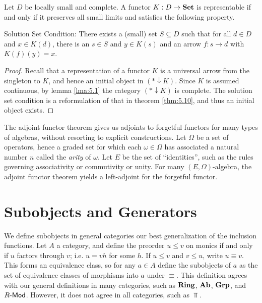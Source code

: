 \begin{theorem}\label{thm:5.12}
	Let $D$ be locally small and complete. A functor $K : D \to \mathbf{Set} $ is representable if and only if it preserves all small limits and satisfies the following property.

	Solution Set Condition: There exists a (small) set $S\subseteq D$ such that for all $d\in D$ and $x\in K(d)$, there is an $s\in S$ and $y\in K(s)$ and an arrow $f : s \to d$ with $K(f)(y)=x$.
\end{theorem}
\begin{proof}
	Recall that a representation of a functor $K$ is a universal arrow from the singleton to $K$, and hence an initial object in $(*\downarrow K)$. Since $K$ is assumed continuous, by lemma \ref{lma:5.1} the category $(*\downarrow K)$ is complete. The solution set condition is a reformulation of that in theorem \ref{thm:5.10}, and thus an initial object exists.
\end{proof}

The adjoint functor theorem gives us adjoints to forgetful functors for many types of algebras, without resorting to explicit constructions. Let $\Omega$ be a set of operators, hence a graded set for which each $\omega\in\Omega$ has associated a natural number $n$ called the \emph{arity} of $\omega$. Let $E$ be the set of ``identities'', such as the rules governing associativity or commutivity or unity. For many $(E,\Omega)$-algebra, the adjoint functor theorem yields a left-adjoint for the forgetful functor.

\section{Subobjects and Generators}

We define subobjects in general categories our best generalization of the inclusion functions. Let $A$ a category, and define the preorder $u\leq v$ on monics if and only if $u$ factors through $v$; i.e. $u=vh$ for some $h$. If $u\leq v$ and $v\leq u$, write $u\equiv v$. This forms an equivalence class, so for any $a\in A$ define the subobjects of $a$ as the set of equivalence classes of morphisms into $a$ under $\equiv $. This definition agrees with our general definitions in many categories, such as $\mathbf{Ring} $, $\mathbf{Ab}$, $\mathbf{Grp} $, and $R\text{-}\mathsf{Mod} $. However, it does not agree in all categories, such as $\Top $.

